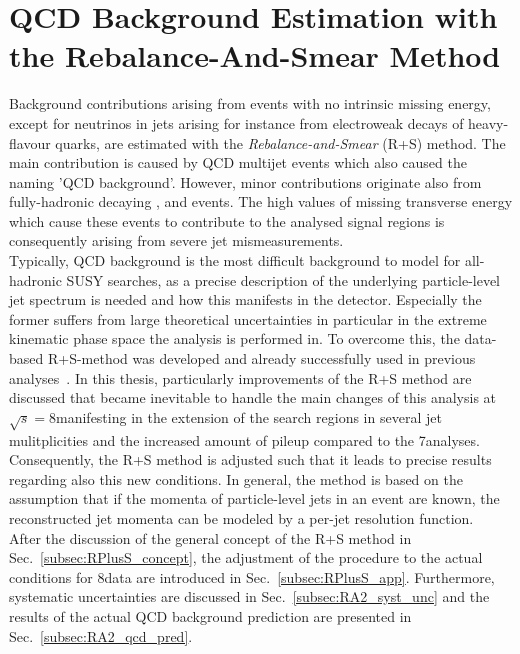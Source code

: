 \section{QCD Background Estimation with the Rebalance-And-Smear Method}
\label{subsec:RA2_QCD}
Background contributions arising from events with no intrinsic missing energy, except for neutrinos in jets arising for instance from electroweak decays of heavy-flavour quarks, are estimated with the \textit{Rebalance-and-Smear} (R+S) method. The main contribution is caused by QCD multijet events which also caused the naming 'QCD background'. However, minor contributions originate also from fully-hadronic decaying \ttbar, \WJets and \ZJets events. The high values of missing transverse energy which cause these events to contribute to the analysed signal regions is consequently arising from severe jet mismeasurements. \\
Typically, QCD background is the most difficult background to model for all-hadronic SUSY searches, as a precise description of the underlying particle-level jet spectrum is needed and how this manifests in the detector. Especially the former suffers from large theoretical uncertainties in particular in the extreme kinematic phase space the analysis is performed in. To overcome this, the data-based R+S-method was developed and already successfully used in previous analyses~\cite{springerlink:10.1007/JHEP08(2011)155, Chatrchyan:2012lia}. In this thesis, particularly improvements of the R+S method are discussed that became inevitable to handle the main changes of this analysis at $\sqrt{s} = 8$\tev manifesting in the extension of the search regions in several jet mulitplicities and the increased amount of pileup compared to the 7\tev analyses. Consequently, the R+S method is adjusted such that it leads to precise results regarding also this new conditions. In general, the method is based on the assumption that if the momenta of particle-level jets in an event are known, the reconstructed jet momenta can be modeled by a per-jet resolution function.  \\
After the discussion of the general concept of the R+S method in Sec.~\ref{subsec:RPlusS_concept}, the adjustment of the procedure to the actual conditions for 8\tev data are introduced in Sec.~\ref{subsec:RPlusS_app}. Furthermore, systematic uncertainties are discussed in Sec.~\ref{subsec:RA2_syst_unc} and the results of the actual QCD background prediction are presented in Sec.~\ref{subsec:RA2_qcd_pred}. 

